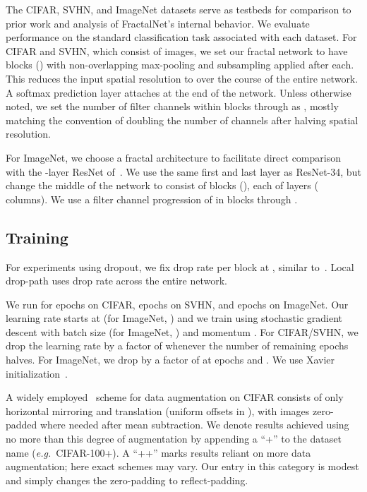\documentclass{article}
\def\eg{\emph{e.g.}}
\newcommand{\fracnet}{FractalNet}
\newcommand{\resnet}{ResNet}
\newcommand{\dropout}{dropout}
\newcommand{\droppath}{drop-path}
\begin{document}
The CIFAR, SVHN, and ImageNet datasets serve as testbeds for comparison to
prior work and analysis of {\fracnet}'s internal behavior.  We evaluate
performance on the standard classification task associated with each
dataset.  For CIFAR and SVHN, which consist of  images, we set
our fractal network to have  blocks () with 
non-overlapping max-pooling and subsampling applied after each.  This reduces
the input  spatial resolution to  over the course of
the entire network.  A softmax prediction layer attaches at the end of the
network.  Unless otherwise noted, we set the number of filter channels within
blocks  through  as , mostly matching the
convention of doubling the number of channels after halving spatial resolution.

For ImageNet, we choose a fractal architecture to facilitate direct comparison
with the -layer {\resnet} of~\cite{he2015deep}.  We use the same first and
last layer as {\resnet}-34, but change the middle of the network to consist of
 blocks (), each of  layers ( columns).  We use a filter
channel progression of  in blocks  through .

\subsection{Training}
\label{sec:training}

For experiments using {\dropout}, we fix drop rate per block at
, similar to~\cite{elu}.  Local {\droppath}
uses  drop rate across the entire network.

We run for  epochs on CIFAR,  epochs on SVHN, and  epochs on
ImageNet.  Our learning rate starts at  (for ImageNet, ) and we
train using stochastic gradient descent with batch size  (for ImageNet,
) and momentum .  For CIFAR/SVHN, we drop the learning rate by a
factor of  whenever the number of remaining epochs halves.  For ImageNet,
we drop by a factor of  at epochs  and .  We use Xavier
initialization~\citep{glorot2010understanding}.

A widely employed~\citep{nin,elu,srivastava2015highway,he2015deep,
he2016identity,huang2016stochasticdepth,rir} scheme for data augmentation on
CIFAR consists of only horizontal mirroring and translation (uniform offsets
in ), with images zero-padded where needed after mean subtraction.
We denote results achieved using no more than this degree of augmentation by
appending a ``+'' to the dataset name (\eg~CIFAR-100+).  A ``++'' marks
results reliant on more data augmentation; here exact schemes may vary.  Our
entry in this category is modest and simply changes the zero-padding to
reflect-padding.
\end{document}
